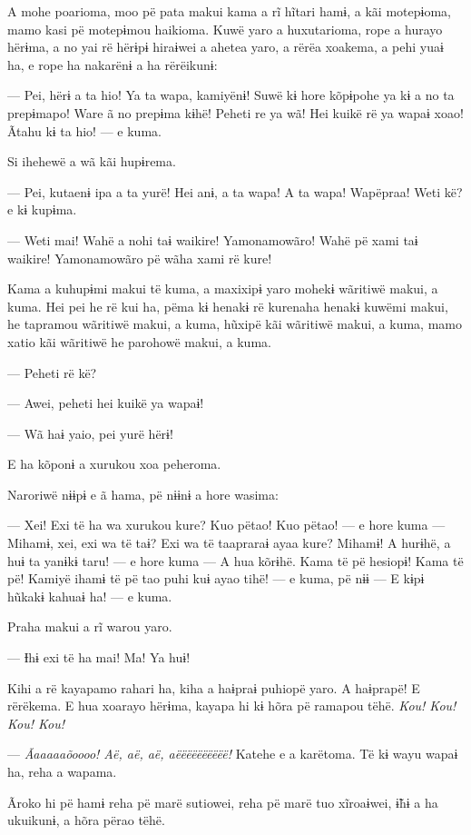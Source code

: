 A mohe poarioma, moo pë pata makui kama a rĩ hĩtari hamɨ, a kãi
motepɨoma, mamo kasi pë motepɨmou haikioma. Kuwë yaro a huxutarioma,
rope a hurayo hërɨma, a no yai rë hërɨpɨ hiraɨwei a ahetea yaro, a rërëa
xoakema, a pehi yuaɨ ha, e rope ha nakarënɨ a ha rërëikunɨ:

--- Pei, hërɨ a ta hio! Ya ta wapa, kamiyënɨ! Suwë kɨ hore kõpɨpohe ya
kɨ a no ta prepɨmapo! Ware ã no prepɨma kɨhë! Peheti re ya wã! Hei kuikë
rë ya wapaɨ xoao! Ãtahu kɨ ta hio! --- e kuma. 

Si ihehewë a wã kãi hupɨrema. 

--- Pei, kutaenɨ ipa a ta yurë! Hei anɨ, a ta wapa! A ta wapa! Wapëpraa!
Weti kë? e kɨ kupɨma.

--- Weti mai! Wahë a nohi taɨ waikire! Yamonamowãro! Wahë pë xami taɨ
waikire! Yamonamowãro pë wãha xami rë kure! 

Kama a kuhupɨmi makui të kuma, a maxixipɨ yaro mohekɨ wãritiwë makui, a
kuma. Hei pei he rë kui ha, pëma kɨ henakɨ rë kurenaha henakɨ kuwëmi
makui, he tapramou wãritiwë makui, a kuma, hũxipë kãi wãritiwë makui, a
kuma, mamo xatio kãi wãritiwë he parohowë makui, a kuma. 

--- Peheti rë kë?

--- Awei, peheti hei kuikë ya wapaɨ! 

--- Wã haɨ yaio, pei yurë hërɨ! 

E ha kõponɨ a xurukou xoa peheroma. 

Naroriwë nɨɨpɨ e ã hama, pë nɨɨnɨ a hore wasima: 

--- Xei! Exi të ha wa xurukou kure? Kuo pëtao! Kuo pëtao! --- e hore
kuma --- Mihamɨ, xei, exi wa të taɨ? Exi wa të taapraraɨ ayaa kure?
Mihamɨ! A hurɨhë, a huɨ ta yanɨkɨ taru! --- e hore kuma --- A hua
kõrɨhë. Kama të pë hesiopɨ! Kama të pë! Kamiyë ihamɨ të pë tao puhi kuɨ
ayao tihë! --- e kuma, pë nɨɨ --- E kɨpɨ hũkakɨ kahuaɨ ha! --- e kuma. 

Praha makui a rĩ warou yaro. 

--- Ɨhɨ exi të ha mai! Ma! Ya huɨ! 

Kihi a rë kayapamo rahari ha, kiha a haɨpraɨ puhiopë yaro. A haɨprapë! E
rërëkema. E hua xoarayo hërɨma, kayapa hi kɨ hõra pë ramapou tëhë. \textit{Kou! Kou! Kou! Kou!} 

--- \textit{Ãaaaaaõoooo! Aë, aë, aë, aëëëëëëëëëë!} Katehe e a
karëtoma. Të kɨ wayu wapaɨ ha, reha a wapama. 

Ãroko hi pë hamɨ reha pë marë sutiowei, reha pë marë tuo xĩroaɨwei, 
ɨ̃hɨ a ha ukuikunɨ, a hõra përao tëhë. 

